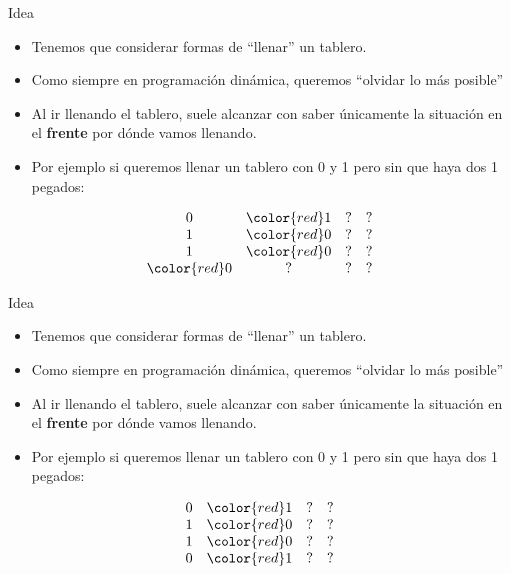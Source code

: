 \documentclass{beamer}
\begin{document}
\begin{frame}{Idea}
    \begin{itemize}
		\item Tenemos que considerar formas de ``llenar'' un tablero.
		\item Como siempre en programación dinámica, queremos ``olvidar lo más posible''
		\item Al ir llenando el tablero, suele alcanzar con saber únicamente la situación en el \textbf{frente} por dónde vamos llenando.
		\item Por ejemplo si queremos llenar un tablero con 0 y 1 pero sin que haya dos 1 pegados:
    \end{itemize}
    $$\begin{array}{cccc}
		0 & \color{red}1 & ? & ? \\
		1 & \color{red}0 & ? & ? \\
		1 & \color{red}0 & ? & ? \\
		\color{red}0 & ? & ? & ? \\
    \end{array}$$
\end{frame}

\begin{frame}{Idea}
    \begin{itemize}
		\item Tenemos que considerar formas de ``llenar'' un tablero.
		\item Como siempre en programación dinámica, queremos ``olvidar lo más posible''
		\item Al ir llenando el tablero, suele alcanzar con saber únicamente la situación en el \textbf{frente} por dónde vamos llenando.
		\item Por ejemplo si queremos llenar un tablero con 0 y 1 pero sin que haya dos 1 pegados:
    \end{itemize}
    $$\begin{array}{cccc}
		0 & \color{red}1 & ? & ? \\
		1 & \color{red}0 & ? & ? \\
		1 & \color{red}0 & ? & ? \\
		0 & \color{red}1 & ? & ? \\
    \end{array}$$
\end{frame}
\end{document}
